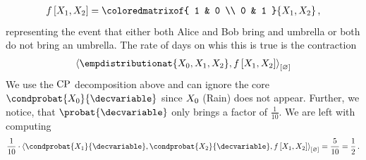 \documentclass{scrartcl}
\begin{document}
{\begin{itemize}
            \begin{align*}
                \formulaat{\catvariableof{1},\catvariableof{2}} =
                \coloredmatrixof{
                    1 & 0 \\
                    0 & 1
                }{\catvariableof{1},\catvariableof{2}}\, ,
            \end{align*}
            representing the event that either both Alice and Bob bring and umbrella or both do not bring an umbrella.
            The rate of days on whis this is true is the contraction
            \begin{align*}
                \contraction{\empdistributionat{\catvariableof{0},\catvariableof{1},\catvariableof{2}}, \formulaat{\catvariableof{1},\catvariableof{2}}}
            \end{align*}
            We use the $\mathrm{CP}$ decomposition above and can ignore the core $\condprobat{\catvariableof{0}}{\decvariable}$ since $X_{0}$ (Rain) does not appear.
            Further, we notice, that $\probat{\decvariable}$ only brings a factor of $\frac{1}{10}$.
            We are left with computing
            \begin{align*}
                \frac{1}{10} \cdot
                \contraction{
                    \condprobat{\catvariableof{1}}{\decvariable}, \condprobat{\catvariableof{2}}{\decvariable},\formulaat{\catvariableof{1},\catvariableof{2}}
                }
                = \frac{5}{10} = \frac{1}{2} \, .
            \end{align*}
        \end{itemize}
    }
\end{document}

